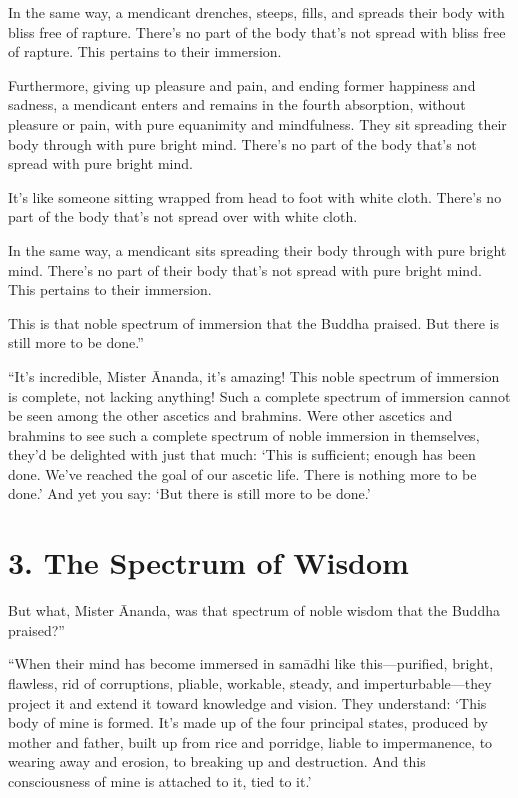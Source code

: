 \documentclass[12pt,openany]{book}%
\begin{document}
In the same way, a mendicant drenches, steeps, fills, and spreads their body with bliss free of rapture. There’s no part of the body that’s not spread with bliss free of rapture. This pertains to their immersion. 

Furthermore, giving up pleasure and pain, and ending former happiness and sadness, a mendicant enters and remains in the fourth absorption, without pleasure or pain, with pure equanimity and mindfulness. They sit spreading their body through with pure bright mind. There’s no part of the body that’s not spread with pure bright mind. 

It’s like someone sitting wrapped from head to foot with white cloth. There’s no part of the body that’s not spread over with white cloth. 

In the same way, a mendicant sits spreading their body through with pure bright mind. There's no part of their body that's not spread with pure bright mind. This pertains to their immersion. 

This is that noble spectrum of immersion that the Buddha praised. But there is still more to be done.” 

“It’s incredible, Mister Ānanda, it’s amazing! This noble spectrum of immersion is complete, not lacking anything! Such a complete spectrum of immersion cannot be seen among the other ascetics and brahmins. Were other ascetics and brahmins to see such a complete spectrum of noble immersion in themselves, they’d be delighted with just that much: ‘This is sufficient; enough has been done. We’ve reached the goal of our ascetic life. There is nothing more to be done.’ And yet you say: ‘But there is still more to be done.’ 

\section*{3. The Spectrum of Wisdom }

But what, Mister Ānanda, was that spectrum of noble wisdom that the Buddha praised?” 

“When their mind has become immersed in \textsanskrit{samādhi} like this—purified, bright, flawless, rid of corruptions, pliable, workable, steady, and imperturbable—they project it and extend it toward knowledge and vision. They understand: ‘This body of mine is formed. It’s made up of the four principal states, produced by mother and father, built up from rice and porridge, liable to impermanence, to wearing away and erosion, to breaking up and destruction. And this consciousness of mine is attached to it, tied to it.’ 
\end{document}
